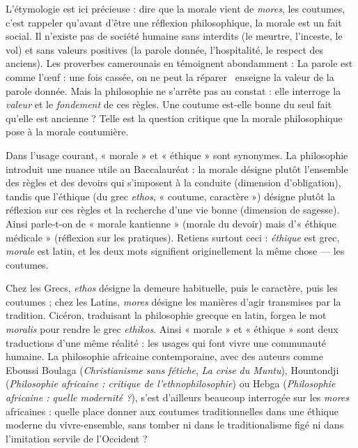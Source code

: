 \documentclass[11pt]{article}
\newcommand{\cle}[1]{{\popxbold\color{popdark}#1}}
\begin{document}
L'étymologie est ici précieuse : dire que la morale vient de \emph{mores}, les coutumes, c'est rappeler qu'avant d'être une réflexion philosophique, la morale est un fait social. Il n'existe pas de société humaine sans interdits (le meurtre, l'inceste, le vol) et sans valeurs positives (la parole donnée, l'hospitalité, le respect des anciens). Les proverbes camerounais en témoignent abondamment : \guillemotleft La parole est comme l'œuf : une fois cassée, on ne peut la réparer \guillemotright\ enseigne la valeur de la parole donnée. Mais la philosophie ne s'arrête pas au constat : elle interroge la \emph{valeur} et le \emph{fondement} de ces règles. Une coutume est-elle bonne du seul fait qu'elle est ancienne ? Telle est la question critique que la morale philosophique pose à la morale coutumière.

\begin{attention}
Dans l'usage courant, « morale » et « éthique » sont synonymes. La philosophie introduit une nuance utile au Baccalauréat : la \cle{morale} désigne plutôt l'ensemble des règles et des devoirs qui s'imposent à la conduite (dimension d'obligation), tandis que l'\cle{éthique} (du grec \emph{ethos}, « coutume, caractère ») désigne plutôt la réflexion sur ces règles et la recherche d'une vie bonne (dimension de sagesse). Ainsi parle-t-on de « morale kantienne » (morale du devoir) mais d'« éthique médicale » (réflexion sur les pratiques). Retiens surtout ceci : \emph{éthique} est grec, \emph{morale} est latin, et les deux mots signifient originellement la même chose — les coutumes.
\end{attention}

\begin{savaistu}
Chez les Grecs, \emph{ethos} désigne la demeure habituelle, puis le caractère, puis les coutumes ; chez les Latins, \emph{mores} désigne les manières d'agir transmises par la tradition. Cicéron, traduisant la philosophie grecque en latin, forgea le mot \emph{moralis} pour rendre le grec \emph{ethikos}. Ainsi « morale » et « éthique » sont deux traductions d'une même réalité : les usages qui font vivre une communauté humaine. La philosophie africaine contemporaine, avec des auteurs comme Eboussi Boulaga (\emph{Christianisme sans fétiche}, \emph{La crise du Muntu}), Hountondji (\emph{Philosophie africaine : critique de l'ethnophilosophie}) ou Hebga (\emph{Philosophie africaine : quelle modernité ?}), s'est d'ailleurs beaucoup interrogée sur les \emph{mores} africaines : quelle place donner aux coutumes traditionnelles dans une éthique moderne du vivre-ensemble, sans tomber ni dans le traditionalisme figé ni dans l'imitation servile de l'Occident ?
\end{savaistu}
\end{document}
